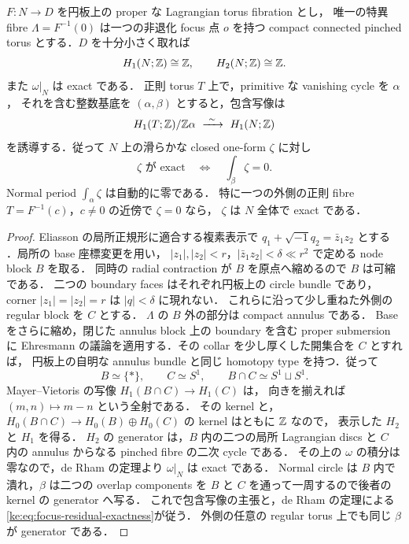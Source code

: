 \begin{lemma}
\label{ke:focus-neighborhood-period}
$F:N\to D$ を円板上の proper な Lagrangian torus fibration とし，
唯一の特異 fibre $\Lambda=F^{-1}(0)$ は一つの非退化 focus 点 $o$ を持つ
compact connected pinched torus とする．$D$ を十分小さく取れば
\[
 H_1(N;\mathbb Z)\cong\mathbb Z,\qquad H_2(N;\mathbb Z)\cong\mathbb Z.
\]
また $\omega|_N$ は exact である．
正則 torus $T$ 上で，primitive な vanishing cycle を $\alpha$，
それを含む整数基底を $(\alpha,\beta)$ とすると，包含写像は
\[
 H_1(T;\ZZ)/\ZZ\alpha\ \xrightarrow{\ \sim\ }\ H_1(N;\ZZ)
\]
を誘導する．従って $N$ 上の滑らかな closed one-form $\zeta$ に対し
\begin{equation}\label{ke:eq:focus-residual-exactness}
 \zeta\text{ が exact}\quad\Longleftrightarrow\quad
 \int_\beta\zeta=0.
\end{equation}
Normal period $\int_\alpha\zeta$ は自動的に零である．
特に一つの外側の正則 fibre $T=F^{-1}(c)$，$c\ne0$ の近傍で $\zeta=0$ なら，
$\zeta$ は $N$ 全体で exact である．
\end{lemma}
\begin{proof}
Eliasson の局所正規形に適合する複素表示で
$q_1+\sqrt{-1}q_2=\bar z_1z_2$ とする
\cite[\S2]{ZungFocus}．局所の base 座標変更を用い，
$|z_1|,|z_2|<r$，$|\bar z_1z_2|<\delta\ll r^2$ で定める node block $B$ を取る．
同時の radial contraction が $B$ を原点へ縮めるので $B$ は可縮である．
二つの boundary faces はそれぞれ円板上の circle bundle であり，
corner $|z_1|=|z_2|=r$ は $|q|<\delta$ に現れない．
これらに沿って少し重ねた外側の regular block を $C$ とする．
$\Lambda$ の $B$ 外の部分は compact annulus である．
Base をさらに縮め，閉じた annulus block 上の boundary を含む proper submersion に
Ehresmann の議論を適用する．その collar を少し厚くした開集合を $C$ とすれば，
円板上の自明な annulus bundle と同じ homotopy type を持つ．従って
\[
 B\simeq\{*\},\qquad C\simeq S^1,
 \qquad B\cap C\simeq S^1\sqcup S^1.
\]
Mayer--Vietoris の写像 $H_1(B\cap C)\to H_1(C)$ は，
向きを揃えれば $(m,n)\mapsto m-n$ という全射である．
その kernel と，$H_0(B\cap C)\to H_0(B)\oplus H_0(C)$ の kernel はともに $\mathbb Z$ なので，
表示した $H_2$ と $H_1$ を得る．
$H_2$ の generator は，$B$ 内の二つの局所 Lagrangian discs と
$C$ 内の annulus からなる pinched fibre の二次 cycle である．
その上の $\omega$ の積分は零なので，de Rham の定理より $\omega|_N$ は exact である．
Normal circle は $B$ 内で潰れ，$\beta$ は二つの overlap components を
$B$ と $C$ を通って一周するので後者の kernel の generator へ写る．
これで包含写像の主張と，de Rham の定理による\eqref{ke:eq:focus-residual-exactness}が従う．
外側の任意の regular torus 上でも同じ $\beta$ が generator である．
\end{proof}

